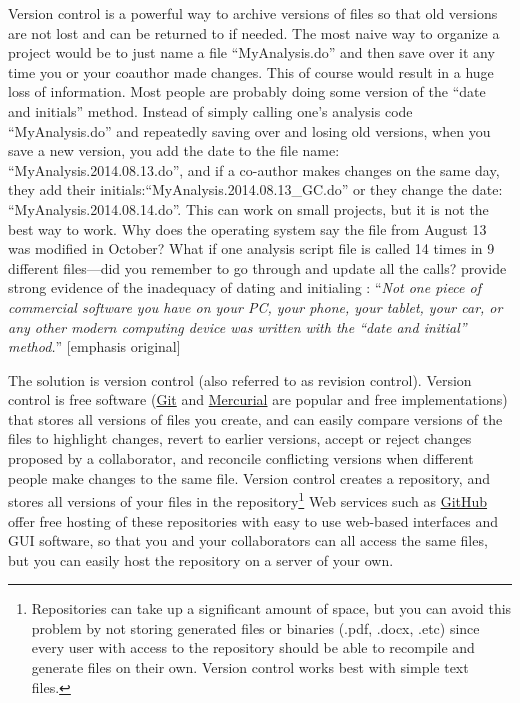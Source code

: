\documentclass[12pt] {article}
\begin{document}
Version control is a powerful way to archive versions of files so that old versions are not lost and can be returned
to if needed. The most naive way to organize a project would be to just name a file ``MyAnalysis.do'' and then save over it any time you or your coauthor made changes. This of course would result in a huge loss of information. Most people are probably doing some version of the ``date and initials'' method. Instead of simply calling one's analysis code ``MyAnalysis.do'' and repeatedly saving over and losing old versions, when you save a new version, you add the date to the file name: ``MyAnalysis.2014.08.13.do'', and if a co-author makes changes on the same day, they add their initials:``MyAnalysis.2014.08.13\_GC.do'' or they change the date: ``MyAnalysis.2014.08.14.do''. This can work on small projects, but it is not the best way to work. Why does the operating system say the file from August 13 was modified in October? What if one analysis script file is called 14 times in 9 different files---did you remember to go through and update all the calls? \cite{GentzkowShapiro} provide strong evidence of the inadequacy of dating and initialing : ``\textit{Not one piece of commercial software you have on your PC, your phone, your tablet, your car, or any other modern computing device was written with the ``date and initial'' method.}'' [emphasis original]

The solution is version control (also referred to as revision control). Version control is free software (\href{https://git-scm.com/book/en/v2/Getting-Started-About-Version-Control}{Git} and \href{https://mercurial.selenic.com/}{Mercurial} are popular and free implementations) that stores all versions of files you create, and can easily compare versions of the files to highlight changes, revert to earlier versions, accept or reject changes proposed by a collaborator, and reconcile conflicting versions when different people make changes to the same file. Version control creates a repository, and stores all versions of your files in the repository\footnote{Repositories can take up a significant amount of space, but you can avoid this problem by not storing generated files or binaries (.pdf, .docx, .etc) since every user with access to the repository should be able to recompile and generate files on their own. Version control works best with simple text files.}  Web services
such as \href{http:www.github.com}{GitHub} offer free hosting of these repositories with easy to use web-based interfaces and GUI software, so that you and your collaborators can all access the same files, but you can easily host the repository on a server of your own. 
\end{document}
